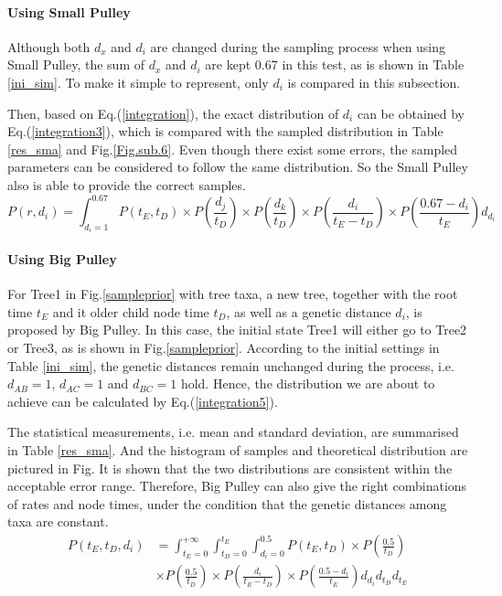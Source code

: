 \documentclass{bmcart}
\begin{document}
\paragraph*{Using Small Pulley}

Although both ${d_x}$ and ${d_i}$ are changed during the sampling process when using Small Pulley, the sum of ${d_x}$ and ${d_i}$ are kept 0.67 in this test, as is shown in Table \ref{ini_sim}. To make it simple to represent, only ${d_i}$ is compared in this subsection.

Then, based on Eq.(\ref{integration}), the exact distribution of ${d_i}$ can be obtained by Eq.(\ref{integration3}), which is compared with the sampled distribution in Table \ref{res_sma} and Fig.\ref{Fig.sub.6}. Even though there exist some errors, the sampled parameters can be considered to follow the same distribution. So the Small Pulley also is able to provide the correct samples.
\begin{equation}\label{integration3}
P(r,{d_i}) = \int_{{d_i} = 1}^{0.67} {P({t_E},{t_D}) \times P(\frac{{{d_j}}}{{{t_D}}}) \times P(\frac{{{d_k}}}{{{t_D}}}) \times P(\frac{{{d_i}}}{{{t_E} - {t_D}}}) \times P(\frac{{0.67 - {d_i}}}{{{t_E}}}){d_{d_i}}}
\end{equation}

\paragraph*{Using Big Pulley}

For Tree1 in Fig.\ref{sampleprior} with tree taxa, a new tree, together with the root time $t_E$ and it older child node time $t_D$, as well as a genetic distance $d_i$, is proposed by Big Pulley. In this case, the initial state Tree1 will either go to Tree2 or Tree3, as is shown in Fig.\ref{sampleprior}.  According to the initial settings in Table \ref{ini_sim}, the genetic distances remain unchanged during the process, i.e. $d_{AB} = 1$, $d_{AC}  = 1$ and $d_{BC} = 1$ hold. Hence, the distribution we are about to achieve can be calculated by Eq.(\ref{integration5}).

The statistical measurements, i.e. mean and standard deviation, are summarised in Table \ref{res_sma}. And the histogram of samples and theoretical distribution are pictured in Fig. It is shown that the two distributions are consistent within the acceptable error range. Therefore, Big Pulley can also give the right combinations of rates and node times, under the condition that the genetic distances among taxa are constant.
\begin{equation}
\label{integration5}
\begin{aligned}
P({t_E},{t_D},{d_i}) &= \int_{{t_E} = 0}^{ + \infty } {\int_{{t_D} = 0}^{{t_E}} {\int_{{d_i} = 0}^{0.5} {P({t_E},{t_D})} } \times P(\frac{{0.5}}{{{t_D}}})}  \\&\times P(\frac{{0.5}}{{{t_D}}}) \times P(\frac{{{d_i}}}{{{t_E} - {t_D}}}) \times P(\frac{{0.5 - {d_i}}}{{{t_E}}}){d_{d_i}}{d_{t_D}}{d_{t_E}}
\end{aligned}
\end{equation}
\end{document}
